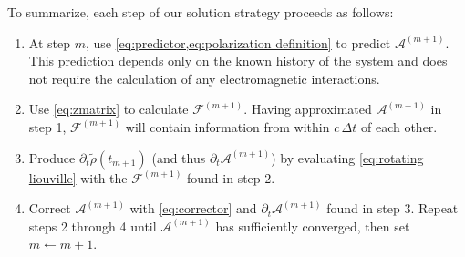To summarize, each step of our solution strategy proceeds as follows:
\begin{enumerate}
  \item At step $m$, use \cref{eq:predictor,eq:polarization definition} to predict $\mathcal{A}^{(m + 1)}$.
    This prediction depends only on the known history of the system and does not require the calculation of any electromagnetic interactions.
  \item Use \cref{eq:zmatrix} to calculate $\mathcal{F}^{(m + 1)}$.
    Having approximated $\mathcal{A}^{(m + 1)}$ in step 1, $\mathcal{F}^{(m + 1)}$ will contain information from \qds{} within $c \, \Delta t$ of each other.
  \item Produce $\partial_t \tilde{\rho}(t_{m + 1})$ (and thus $\partial_t \mathcal{A}^{(m + 1)}$) by evaluating \cref{eq:rotating liouville} with the $\mathcal{F}^{(m+1)}$ found in step 2.
  \item Correct $\mathcal{A}^{(m + 1)}$ with \cref{eq:corrector} and $\partial_t \mathcal{A}^{(m + 1)}$ found in step 3.
    Repeat steps 2 through 4 until $\mathcal{A}^{(m + 1)}$ has sufficiently converged, then set $m \leftarrow m + 1$.
\end{enumerate}
